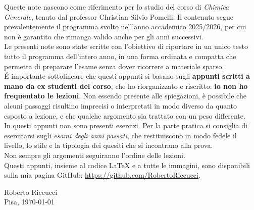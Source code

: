 Queste note nascono come riferimento per lo studio del corso di \emph{Chimica Generale}, tenuto dal professor Christian Silvio Pomelli. Il contenuto segue prevalentemente il programma svolto nell'anno accademico 2025/2026, per cui non è garantito che rimanga valido anche per gli anni successivi. \\
Le presenti note sono state scritte con l'obiettivo di riportare in un unico testo tutto il programma dell'intero anno, in una forma ordinata e compatta che permetta di preparare l'esame senza dover ricorrere a materiale sparso. \\
 
\' E importante sottolineare che questi appunti si basano sugli \textbf{appunti scritti a mano da ex studenti del corso}, che ho riorganizzato e riscritto: \textbf{io non ho frequentato le lezioni}. Non essendo presente alle spiegazioni, è possibile che alcuni passaggi risultino imprecisi o interpretati in modo diverso da quanto esposto a lezione, e che qualche argomento sia trattato con un peso differente.\\
 
In questi appunti non sono presenti esercizi. Per la parte pratica si consiglia di esercitarsi sugli \emph{esami degli anni passati}, che restituiscono in modo fedele il livello, lo stile e la tipologia dei quesiti che si incontrano alla prova. \\
 
Non sempre gli argomenti seguiranno l'ordine delle lezioni. \\
 
Questi appunti, insieme al codice \LaTeX{} e a tutte le immagini, sono disponibili sulla mia pagina GitHub: \url{https://github.com/RobertoRiccucci}.
 
\begin{flushright}
Roberto Riccucci\\
Pisa, \today
\end{flushright}
